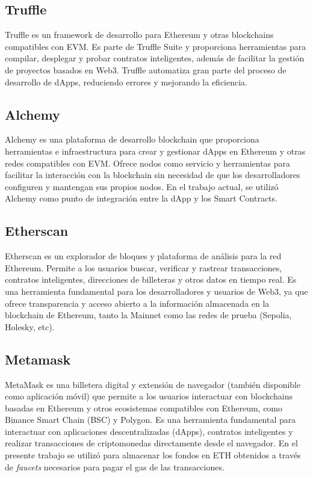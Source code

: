 \subsection{Truffle}

Truffle \cite{truffle_website} es un framework de desarrollo para Ethereum y otras blockchains compatibles con EVM. Es parte de Truffle Suite y proporciona herramientas para compilar, desplegar y probar contratos inteligentes, además de facilitar la gestión de proyectos basados en Web3. Truffle automatiza gran parte del proceso de desarrollo de dApps, reduciendo errores y mejorando la eficiencia.

\subsection{Alchemy}

Alchemy \cite{alchemy_website} es una plataforma de desarrollo blockchain que proporciona herramientas e infraestructura para crear y gestionar dApps en Ethereum y otras redes compatibles con EVM. Ofrece nodos como servicio y herramientas para facilitar la interacción con la blockchain sin necesidad de que los desarrolladores configuren y mantengan sus propios nodos. En el trabajo actual, se utilizó Alchemy como punto de integración entre la dApp y los Smart Contracts.

\subsection{Etherscan}

Etherscan \cite{etherscan} es un explorador de bloques y plataforma de análisis para la red Ethereum. Permite a los usuarios buscar, verificar y rastrear transacciones, contratos inteligentes, direcciones de billeteras y otros datos en tiempo real. Es una herramienta fundamental para los desarrolladores y usuarios de Web3, ya que ofrece transparencia y acceso abierto a la información almacenada en la blockchain de Ethereum, tanto la Mainnet como las redes de prueba (Sepolia, Holesky, etc).

\subsection{Metamask}

MetaMask \cite{metamask} es una billetera digital y extensión de navegador (también disponible como aplicación móvil) que permite a los usuarios interactuar con blockchains basadas en Ethereum y otros ecosistemas compatibles con Ethereum, como Binance Smart Chain (BSC) y Polygon. Es una herramienta fundamental para interactuar con aplicaciones descentralizadas (dApps), contratos inteligentes y realizar transacciones de criptomonedas directamente desde el navegador.
En el presente trabajo se utilizó para almacenar los fondos en ETH obtenidos a través de \textit{faucets} necesarios para pagar el gas de las transacciones.


